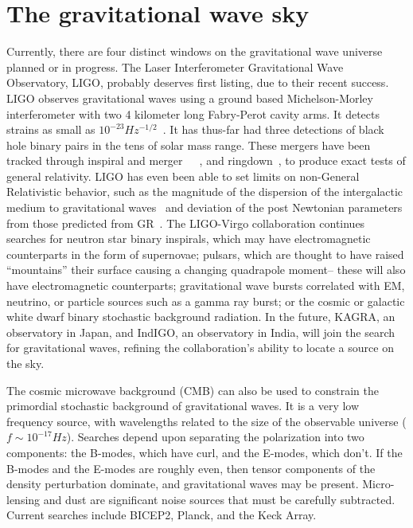\section{The gravitational wave sky}
Currently, there are four distinct windows on the gravitational wave universe planned or in progress. The Laser Interferometer Gravitational Wave Observatory, LIGO, probably deserves first listing, due to their recent success. LIGO observes gravitational waves using a ground based Michelson-Morley interferometer with two 4 kilometer long Fabry-Perot cavity arms. It detects strains as small as $10^{-23} Hz^{-1/2}$~\cite{LIGOsensitivity}. It has thus-far had three detections of black hole binary pairs in the tens of solar mass range. These mergers have been tracked through inspiral and merger~\cite{GW150914}~\cite{GW151226}~\cite{GW170104}, and ringdown~\cite{LIGO1e}, to produce exact tests of general relativity. LIGO has even been able to set limits on non-General Relativistic behavior, such as the magnitude of the dispersion of the intergalactic medium to gravitational waves~\cite{GW170104} and deviation of the post Newtonian parameters from those predicted from GR~\cite{LIGO1e}. The LIGO-Virgo collaboration continues searches for neutron star binary inspirals, which may have electromagnetic counterparts in the form of supernovae; pulsars, which are thought to have raised ``mountains'' their surface causing a changing quadrapole moment-- these will also have electromagnetic counterparts; gravitational wave bursts correlated with EM, neutrino, or particle sources such as a gamma ray burst; or the cosmic or galactic white dwarf binary stochastic background radiation. In the future, KAGRA, an observatory in Japan, and IndIGO, an observatory in India, will join the search for gravitational waves, refining the collaboration's ability to locate a source on the sky. 


The cosmic microwave background (CMB) can also be used to constrain the primordial stochastic background of gravitational waves. It is a very low frequency source, with wavelengths related to the size of the observable universe ($f\sim 10^{-17} Hz$). Searches depend upon separating the polarization into two components: the B-modes, which have curl, and the E-modes, which don't. If the B-modes and the E-modes are roughly even, then tensor components of the density perturbation dominate, and gravitational waves may be present. Micro-lensing and dust are significant noise sources that must be carefully subtracted. Current searches include BICEP2, Planck, and the Keck Array. 


